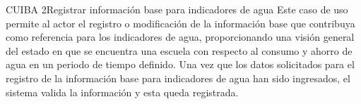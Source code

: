 
\begin{UseCase}{CUIBA 2}{Registrar información base para indicadores de agua}
    {
	  Este caso de uso permite al actor el registro o modificación de la información base que contribuya como referencia para los indicadores de agua, proporcionando una visión general del estado en que se encuentra una escuela con respecto al consumo y ahorro de agua en un periodo de tiempo definido. Una vez que los datos solicitados para el registro de la información base para indicadores de agua han sido ingresados, el sistema valida la información y esta queda registrada.
    }
    


\end{UseCase}
